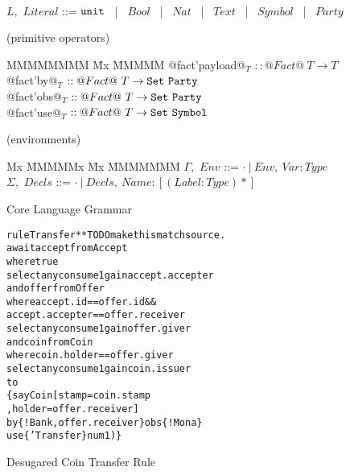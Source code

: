 \begin{figure}
\begin{tabbing}
\\[1ex]
  $L,$   \> $Literal$   \> ::= \> $\texttt{unit}$ ~|~ $Bool$ ~|~ $Nat$ ~|~ $Text$ ~|~ $Symbol$ ~|~ $Party$
\end{tabbing}

\medskip
\begin{flushleft}
(primitive operators)
\end{flushleft}
\begin{tabbing}
MMMMMMMM \= Mx \= MMMMM \kill
   @fact'payload@$_T$ \> $:: @Fact@~ T \to T$
\\ @fact'by@$_T$      \> $:: @Fact@~ T \to \texttt{Set}~ \texttt{Party}$
\\ @fact'obs@$_T$     \> $:: @Fact@~ T \to \texttt{Set}~ \texttt{Party}$
\\ @fact'use@$_T$     \> $:: @Fact@~ T \to \texttt{Set}~ \texttt{Symbol}$
\end{tabbing}

\medskip
\begin{flushleft}
(environments)
\begin{tabbing}
Mx              \= MMMMMx       \= Mx \= MMMMMMM \kill
   $\Gamma,$       \> $Env$     \> ::= \> $\cdot ~|~ Env,~ Var : Type$
\\ $\Sigma,$       \> $Decls$   \> ::= \> $\cdot ~|~ Decls,~ Name : [(Label : Type)*]$
\end{tabbing}
\end{flushleft}

\caption{Core Language Grammar}
\label{f:Grammar}
\end{figure}


\begin{figure}
\begin{small}
\begin{alltt}
rule  Transfer                ** TODO make this match source.
await accept from Accept
       where true
       select any  consume 1 gain accept.accepter
 and  offer  from Offer
       where accept.id       == offer.id  &&
             accept.accepter == offer.receiver
       select any  consume 1 gain offer.giver
 and  coin   from Coin
       where coin.holder == offer.giver
       select any  consume 1 gain coin.issuer
to
    \{ say Coin [ stamp  = coin.stamp
               , holder = offer.receiver]
       by  \{ !Bank, offer.receiver \}  obs \{ !Mona \}
       use \{ 'Transfer \}              num 1) \}
\end{alltt}
\end{small}

\caption{Desugared Coin Transfer Rule}
\label{f:CoinTransferDesugared}
\end{figure}


